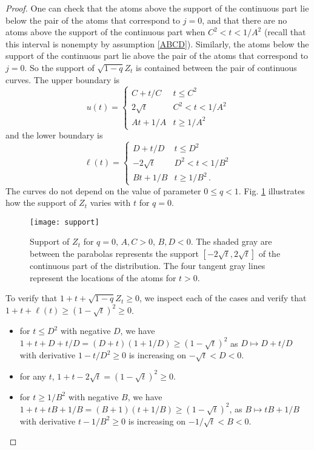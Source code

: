 \documentclass{amsart}
\theoremstyle{definition}
\theoremstyle{remark}
\theoremstyle{remark}
\theoremstyle{definition}
\numberwithin{equation}{section}
\begin{document}
\begin{proof}
One can check that the atoms above the support of the continuous part lie below the pair of the    atoms  that correspond to
$j=0$, and that there are no atoms above the support of the continuous part when $C^2<t<1/A^2$ (recall that this interval is
nonempty by assumption \eqref{ABCD}). Similarly, the atoms below the support of the continuous part lie above the pair of the
atoms   that correspond to $j=0$. So the support of $\sqrt{1-q}Z_t$ is contained between the pair of continuous curves. The
upper boundary is
\begin{equation}
  \label{u(t)}
  u(t)=\begin{cases}
   C+t/C & t\leq C^2 \\
   2\sqrt{t} & C^2<t<1/A^2\\
   At+ 1/A & t\geq 1/A^2
\end{cases}
\end{equation}
and the lower boundary is
$$
\ell(t)=\begin{cases}
   D+t/D & t\leq D^2 \\
   -2\sqrt{t} & D^2<t<1/B^2\\
   Bt+ 1/B & t\geq 1/B^2\,.
\end{cases}
$$
The curves do not depend on the value of parameter $0\leq q<1$.    Fig. \ref{Fig2} illustrates how the support of $Z_t$ varies
with $t$ for $q=0$.
\begin{figure}[H]
\texttt{[image: support]}
\caption{Support of $Z_t$ for $q=0$, $A,C>0$, $B,D<0$. The shaded gray are between the parabolas represents the support  $[-2\sqrt{t},2\sqrt{t}]$ of the continuous part of the distribution. The  four tangent
gray lines represent the locations of the atoms for   $t>0$.
\label{Fig2}
}
\end{figure}

To verify that $1+t+\sqrt{1-q}Z_t\geq 0$, we inspect  each of the cases  and verify that $1+t+\ell(t)\geq (1-\sqrt{t})^2\geq 0$.
\begin{itemize}
  \item for $t\leq D^2$ with negative $D$, we have $1+t+D+t/D=(D+t)(1+1/D)\geq  (1-\sqrt{t})^2$ as $D\mapsto D+t/D$ with derivative $1-t/D^2\geq 0$ is increasing on $-\sqrt{t}<D<0$.

 \item for any $t$, $1+t-2\sqrt{t}=(1-\sqrt{t})^2\geq 0$.

\item  for $t\geq 1/B^2$  with negative $B$, we have $1+t+tB+1/B =(B+1)(t+1/B)\geq  (1-\sqrt{t})^2$, as $B\mapsto tB+1/B$ with derivative $t-1/B^2\geq 0$
is increasing on $-1/\sqrt{t}<B<0$.
\end{itemize}


\end{proof}
\end{document}
